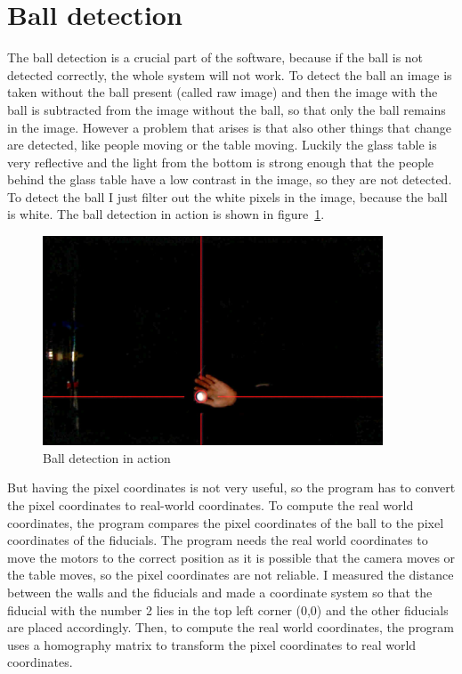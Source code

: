 \section{Ball detection}\label{sec:ball-detection}
The ball detection is a crucial part of the software, because if the ball is not detected correctly, the whole system will not work.
To detect the ball an image is taken without the ball present (called raw image) and then the image with the ball is subtracted from the image without the ball, so that only the ball remains in the image.
However a problem that arises is that also other things that change are detected, like people moving or the table moving.
Luckily the glass table is very reflective and the light from the bottom is strong enough that the people behind the glass table have a low contrast in the image, so they are not detected.
To detect the ball I just filter out the white pixels in the image, because the ball is white.
The ball detection in action is shown in figure~\ref{fig:ball_detection}.
\begin{figure}[H]
    \centering
    \includegraphics[width=0.9\textwidth]{../photos/ball_detection}
    \caption[ball-detection]{Ball detection in action}
    \label{fig:ball_detection}
\end{figure}
But having the pixel coordinates is not very useful, so the program has to convert the pixel coordinates to real-world coordinates.
To compute the real world coordinates, the program compares the pixel coordinates of the ball to the pixel coordinates of the fiducials.
The program needs the real world coordinates to move the motors to the correct position as it is possible that the camera moves or the table moves, so the pixel coordinates are not reliable.
I measured the distance between the walls and the fiducials and made a coordinate system so that the fiducial with the number 2 lies in the top left corner (0,0) and the other fiducials are placed accordingly.
Then, to compute the real world coordinates, the program uses a homography\autocite{homography} matrix to transform the pixel coordinates to real world coordinates.


